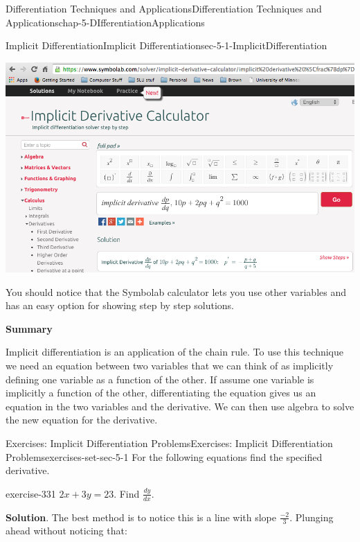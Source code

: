 \documentclass[oneside,10pt,]{book}
\newcommand{\terminology}[1]{\textbf{#1}}
\numberwithin{equation}{section}
\begin{document}
\begin{chapterptx}{Differentiation Techniques and Applications}{}{Differentiation Techniques and Applications}{}{}{chap-5-DIfferentiationApplications}
\begin{sectionptx}{Implicit Differentiation}{}{Implicit Differentiation}{}{}{sec-5-1-ImplicitDifferentiation}
\begin{sidebyside}{1}{0.15}{0.15}{0}
\begin{sbspanel}{0.7}
\includegraphics[width=1\linewidth]{images/sec5-1-3.png}
\end{sbspanel}%
\end{sidebyside}%
\par
\hypertarget{p-1895}{}%
You should notice that the Symbolab calculator lets you use other variables and has an easy option for showing step by step solutions.%
\par
\hypertarget{p-1896}{}%
\terminology{Summary}%
\par
\hypertarget{p-1897}{}%
Implicit differentiation is an application of the chain rule.  To use this technique we need an equation between two variables that we can think of as implicitly defining one variable as a function of the other.  If assume one variable is implicitly a function of the other, differentiating the equation gives us an equation in the two variables and the derivative.  We can then use algebra to solve the new equation for the derivative.%
%
%
\typeout{************************************************}
\typeout{************************************************}
%
\begin{exercises-subsection-numberless}{Exercises: Implicit Differentiation Problems}{}{Exercises: Implicit Differentiation Problems}{}{}{exercises-set-sec-5-1}
\hypertarget{p-1898}{}%
For the following equations find the specified derivative.%
\begin{divisionexercise}{1}{}{}{exercise-331}%
\hypertarget{p-1899}{}%
\(2x+3y=23\).	Find \(\frac{dy}{dx}\).%
\par\smallskip%
\noindent\textbf{Solution}.\hypertarget{solution-166}{}\quad%
\hypertarget{p-1900}{}%
The best method is to notice this is a line with slope \(\frac{-2}{3}\).  Plunging ahead without noticing that:%

\end{divisionexercise}
\end{exercises-subsection-numberless}
\end{sectionptx}
\end{chapterptx}
\end{document}
